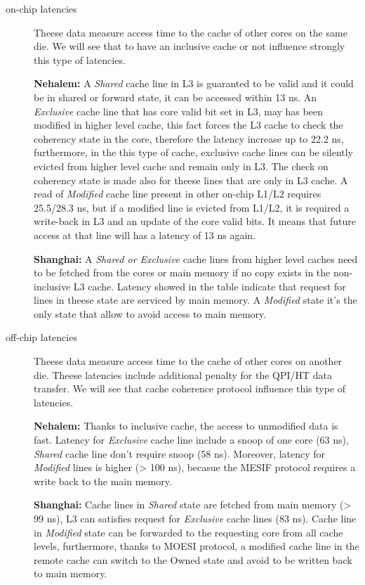 \begin{description} %

\item[on-chip latencies] Theese data measure access time to the cache of other cores on the same die. We will see that to have an inclusive cache or not
influence strongly this type of latencies. 

\textbf{Nehalem:} A \textit{Shared} cache line in L3 is guaranted to be valid and it could be in shared or forward state, it can be accessed within 13 ns. 
An \textit{Exclusive} cache line that has core valid bit set in L3, may has been modified in higher level cache, this fact forces the L3 cache to check the 
coherency state in the core, therefore the latency increase up to 22.2 ns, furthermore, in the this type of cache, exclusive cache lines can be silently 
evicted from higher level cache and remain only in L3. The check on coherency state is made also for theese lines that are only in L3 cache.
A read of \textit{Modified} cache line present in other on-chip L1/L2 requires 25.5/28.3 ns, but if a modified line is evicted from L1/L2, it is required a 
write-back in L3 and an update of the core valid bits. It means that future access at that line will has a latency of 13 ns again.

\textbf{Shanghai:} A \textit{Shared or Exclusive} cache lines from higher level caches need to be fetched from the cores or main memory if no copy exists 
in the non-inclusive L3 cache. Latency showed in the table indicate that request for lines in theese state are serviced by main memory.
A \textit{Modified} state it's the only state that allow to avoid access to main memory.

\item[off-chip latencies] Theese data measure access time to the cache of other cores on another die. Theese latencies include additional penalty for the
QPI/HT data transfer. We will see that cache coherence protocol influence this type of latencies.

\textbf{Nehalem:} Thanks to inclusive cache, the access to unmodified data is fast. Latency for \textit{Exclusive} cache line include a snoop of one core 
(63 ns), \textit{Shared} cache line don't require snoop (58 ns). Moreover, latency for \textit{Modified} lines is higher (> 100 ns), becasue the MESIF 
protocol requires a write back to the main memory.

\textbf{Shanghai:} Cache lines in \textit{Shared} state are fetched from main memory (> 99 ns), L3 can satisfies request for \textit{Exclusive} cache lines 
(83 ns). Cache line in \textit{Modified} state can be forwarded to the requesting core from all cache levels, furthermore, thanks to MOESI protocol, a 
modified cache line in the remote cache can switch to the Owned state and avoid to be written back to main memory.

\end{description} %

